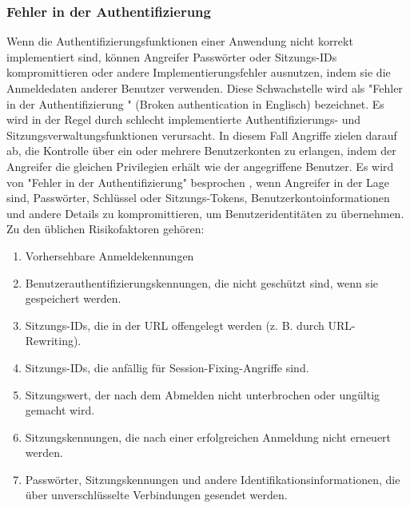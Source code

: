 \subsubsection{Fehler in der Authentifizierung}

Wenn die Authentifizierungsfunktionen  einer Anwendung nicht korrekt
implementiert sind, können Angreifer Passwörter oder Sitzungs-IDs
kompromittieren oder andere Implementierungsfehler ausnutzen, indem
sie die Anmeldedaten anderer Benutzer verwenden. Diese Schwachstelle
wird als "Fehler in der Authentifizierung " (Broken authentication
in Englisch) bezeichnet. Es wird in der Regel durch schlecht
implementierte Authentifizierungs- und Sitzungsverwaltungsfunktionen
verursacht. In diesem Fall Angriffe zielen darauf ab, die Kontrolle
über ein oder mehrere Benutzerkonten zu erlangen, indem der Angreifer
die gleichen Privilegien erhält wie der angegriffene Benutzer.
Es wird von "Fehler in der Authentifizierung" besprochen , wenn
Angreifer in der Lage sind, Passwörter, Schlüssel oder
Sitzungs-Tokens, Benutzerkontoinformationen und andere
Details zu kompromittieren, um Benutzeridentitäten zu übernehmen.
Zu den üblichen Risikofaktoren gehören:


\begin{enumerate}
    \item Vorhersehbare Anmeldekennungen
    \item Benutzerauthentifizierungskennungen, die nicht geschützt sind, wenn sie gespeichert werden.
    \item Sitzungs-IDs, die in der URL offengelegt werden (z. B. durch URL-Rewriting).
    \item Sitzungs-IDs, die anfällig für Session-Fixing-Angriffe sind.
    \item Sitzungswert, der nach dem Abmelden nicht unterbrochen oder ungültig gemacht wird.
    \item Sitzungskennungen, die nach einer erfolgreichen Anmeldung nicht erneuert werden.
    \item Passwörter, Sitzungskennungen und andere Identifikationsinformationen, die über unverschlüsselte Verbindungen gesendet werden.
\end{enumerate}